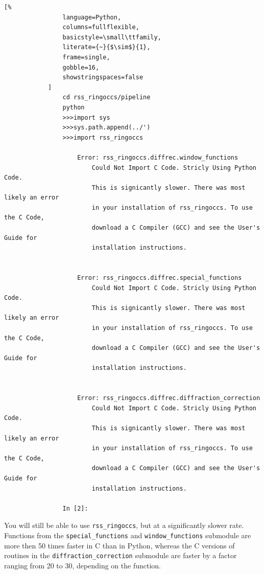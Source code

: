 \documentclass[titlepage, 12pt]{article}
\begin{document}
            \begin{lstlisting}[%
                language=Python,
                columns=fullflexible,
                basicstyle=\small\ttfamily,
                literate={~}{$\sim$}{1},
                frame=single,
                gobble=16,
                showstringspaces=false
            ]
                cd rss_ringoccs/pipeline
                python
                >>>import sys
                >>>sys.path.append(../')
                >>>import rss_ringoccs
                
                    Error: rss_ringoccs.diffrec.window_functions
                        Could Not Import C Code. Stricly Using Python Code.
                        This is signicantly slower. There was most likely an error
                        in your installation of rss_ringoccs. To use the C Code,
                        download a C Compiler (GCC) and see the User's Guide for
                        installation instructions.
                        
                
                    Error: rss_ringoccs.diffrec.special_functions
                        Could Not Import C Code. Stricly Using Python Code.
                        This is signicantly slower. There was most likely an error
                        in your installation of rss_ringoccs. To use the C Code,
                        download a C Compiler (GCC) and see the User's Guide for
                        installation instructions.
                
                
                    Error: rss_ringoccs.diffrec.diffraction_correction
                        Could Not Import C Code. Stricly Using Python Code.
                        This is signicantly slower. There was most likely an error
                        in your installation of rss_ringoccs. To use the C Code,
                        download a C Compiler (GCC) and see the User's Guide for
                        installation instructions.
                
                In [2]: 
            \end{lstlisting}
            You will still be able to use
            \texttt{rss\_ringoccs}, but at a significantly
            slower rate. Functions from the
            \texttt{special\_functions} and
            \texttt{window\_functions} submodule are more then 50 times faster in C than in Python,
            whereas the C versions of routines in the
            \texttt{diffraction\_correction} submodule
            are faster by a factor ranging from 20
            to 30, depending on the function.
\end{document}
